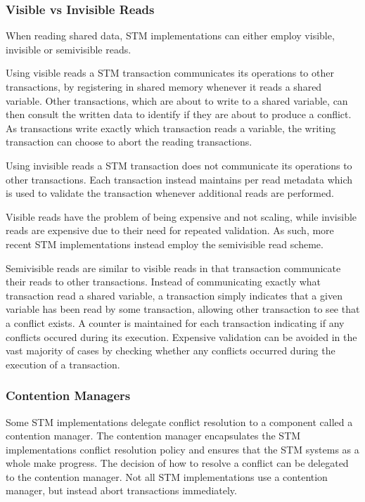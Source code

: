 \subsubsection{Visible vs Invisible Reads}
When reading shared data, \ac{STM} implementations can either employ visible, invisible or semivisible reads.

Using visible reads a \ac{STM} transaction communicates its operations to other transactions, by registering in shared memory whenever it reads a shared variable\cite[p. 2]{lev2009anatomy}\cite[p. 2085]{herlihy2011tm}. Other transactions, which are about to write to a shared variable, can then consult the written data to identify if they are about to produce a conflict. As transactions write exactly which transaction reads a variable, the writing transaction can choose to abort the reading transactions\cite[p. 2]{lev2009anatomy}.

Using invisible reads a \ac{STM} transaction does not communicate its operations to other transactions\cite[p. 114]{imbs2012virtual}. Each transaction instead maintains per read metadata which is used to validate the transaction whenever additional reads are performed\cite[p. 2085]{herlihy2011tm}.

Visible reads have the problem of being expensive and not scaling, while invisible reads are expensive due to their need for repeated validation. As such, more recent \ac{STM} implementations instead employ the semivisible read scheme\cite[p. 2085]{herlihy2011tm}.

Semivisible reads are similar to visible reads in that transaction communicate their reads to other transactions. Instead of communicating exactly what transaction read a shared variable, a transaction simply indicates that a given variable has been read by some transaction, allowing other transaction to see that a conflict exists. A counter is maintained for each transaction indicating if any conflicts occured during its execution. Expensive validation can be avoided in the vast majority of cases by checking whether any conflicts occurred during the execution of a transaction\cite[p. 2]{lev2009anatomy}.

\subsubsection{Contention Managers}
\label{subsub:con_managers}
Some \ac{STM} implementations delegate conflict resolution to a component called a contention manager\cite[p. 2085]{herlihy2011tm}. The contention manager encapsulates the \ac{STM} implementations conflict resolution policy\cite[p. 2085]{herlihy2011tm} and ensures that the \ac{STM} systems as a whole make progress\cite[p. 1]{guerraoui2005toward}. The decision of how to resolve a conflict can be delegated to the contention manager. Not all \ac{STM} implementations use a contention manager, but instead abort transactions immediately\cite[38]{riegel2013software}.

